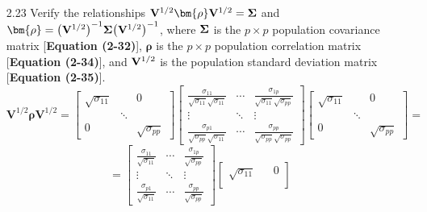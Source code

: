 \begin{enumerate}[font=\bfseries]
        \item[2.23] Verify the relationships $\bold{V}^{1/2}\bm{\rho}\bold{V}^{1/2} = \bold{\Sigma}$ and $\bm{\rho} = {\left(\bold{V}^{1/2}\right)}^{-1}\bold{\Sigma}{\left(\bold{V}^{1/2}\right)}^{-1}$, where $\bold{\Sigma}$ is the
        $p \times p$ population covariance matrix [\textbf{Equation (2-32)}], $\bm{\rho}$ is the $p \times p$ population correlation
        matrix [\textbf{Equation (2-34)}], and $\bold{V}^{1/2}$ is the population standard deviation matrix
        [\textbf{Equation (2-35)}].
        \[
            \mathbf{V}^{1/2}\bm{\rho}\mathbf{V}^{1/2}
            =
            \begin{bmatrix}
                \sqrt{\sigma_{11}} & & 0 \\
                & \ddots & \\
                0 & & \sqrt{\sigma_{pp}}
            \end{bmatrix}
            \begin{bmatrix}
                \frac{\sigma_{11}}{\sqrt{\sigma_{11}}\sqrt{\sigma_{11}}} & \cdots & \frac{\sigma_{1p}}{\sqrt{\sigma_{11}}\sqrt{\sigma_{pp}}} \\
                \vdots & \ddots & \vdots \\
                \frac{\sigma_{p1}}{\sqrt{\sigma_{pp}}\sqrt{\sigma_{11}}} & \cdots & \frac{\sigma_{pp}}{\sqrt{\sigma_{pp}}\sqrt{\sigma_{pp}}}
            \end{bmatrix}
            \begin{bmatrix}
                \sqrt{\sigma_{11}} & & 0 \\
                & \ddots & \\
                0 & & \sqrt{\sigma_{pp}}
            \end{bmatrix}
            =
        \]
        \[
            =
            \begin{bmatrix}
                \frac{\sigma_{11}}{\sqrt{\sigma_{11}}} & \cdots & \frac{\sigma_{1p}}{\sqrt{\sigma_{pp}}} \\
                \vdots & \ddots & \vdots \\
                \frac{\sigma_{p1}}{\sqrt{\sigma_{11}}} & \cdots & \frac{\sigma_{pp}}{\sqrt{\sigma_{pp}}}
            \end{bmatrix}
            \begin{bmatrix}
                \sqrt{\sigma_{11}} & & 0 \\

\end{bmatrix}\]
\end{enumerate}

